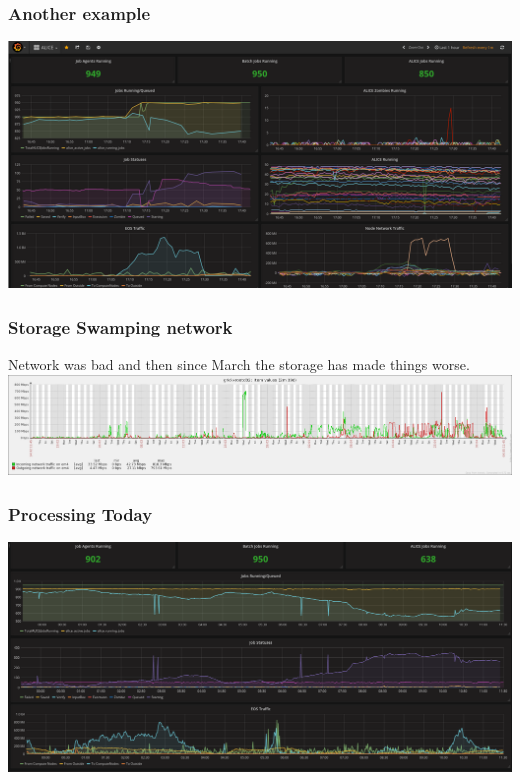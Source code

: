 \documentclass{beamer}
\begin{document}
\begin{frame}
    \frametitle{Another example }
    \includegraphics[scale=0.25]{ALICETier2-Status-AttemptToStart50JobsAndBlowsUpUnknownReason-FailedFeedbackLoop.png}
\end{frame}
\begin{frame}
    \frametitle{Storage Swamping network}
    Network was bad and then since March the storage has made things worse.\\
    \includegraphics[scale=0.25]{StorageNetworkUsage.png}
\end{frame}
\begin{frame}
    \frametitle{Processing Today}
    \includegraphics[scale=0.25]{ALICEStatus-20170504.png}
\end{frame}
\end{document}
